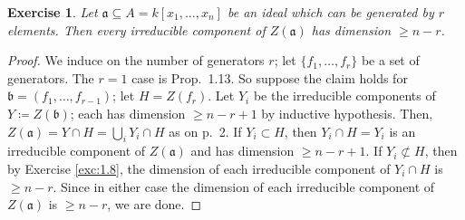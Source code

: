 \documentclass[12pt,letterpaper]{article}
\newtheorem{problem}{Exercise}[section]
\theoremstyle{definition}
\theoremstyle{remark}
\numberwithin{equation}{section}
\numberwithin{figure}{problem}
\begin{document}
\begin{problem}
  Let $\mathfrak{a} \subseteq A = k[x_1,\ldots,x_n]$ be an ideal which can be
  generated by $r$ elements.
  Then every irreducible component of $Z(\mathfrak{a})$ has dimension $\ge n-r$.
\end{problem}
\begin{proof}
  We induce on the number of generators $r$; let $\{f_1,\ldots,f_r\}$ be
  a set of generators.
  The $r=1$ case is Prop.~1.13.
  So suppose the claim holds for $\mathfrak{b} = (f_1,\ldots,f_{r-1})$; let $H = Z(f_r)$.
  Let $Y_i$ be the irreducible components of $Y \coloneqq Z(\mathfrak{b})$; each has
  dimension $\ge n-r+1$ by inductive hypothesis.
  Then, $Z(\mathfrak{a}) = Y \cap H = \bigcup_i Y_i \cap H$ as on p.~2.
  If $Y_i \subset H$, then $Y_i \cap H = Y_i$ is an irreducible component of
  $Z(\mathfrak{a})$ and has dimension $\ge n-r+1$.
  If $Y_i \not\subset H$, then by Exercise \ref{exc:1.8}, the dimension of each
  irreducible component of $Y_i \cap H$ is $\ge n-r$. 
  Since in either case the dimension of each irreducible component of
  $Z(\mathfrak{a})$ is $\ge n-r$, we are done.
\end{proof}
\end{document}
